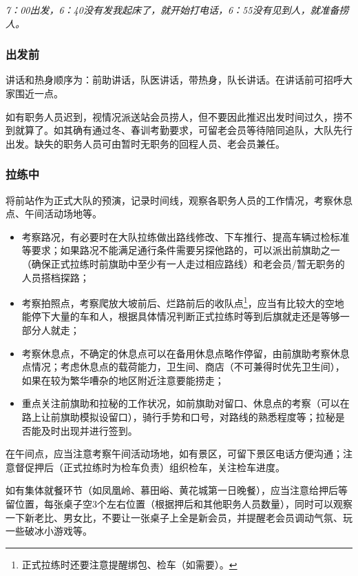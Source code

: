 \documentclass[UTF8]{ctexart}
\begin{document}
\textit{7：00出发，6：40没有发我起床了，就开始打电话，6：55没有见到人，就准备捞人。}

\subsubsection{出发前}

讲话和热身顺序为：前助讲话，队医讲话，带热身，队长讲话。在讲话前可招呼大家围近一点。

如有职务人员迟到，视情况派送站会员捞人，但不要因此推迟出发时间过久，捞不到就算了。如其确有通过冬、春训考勤要求，可留老会员等待陪同追队，大队先行出发。缺失的职务人员可由暂时无职务的回程人员、老会员兼任。

\subsubsection{拉练中}

将前站作为正式大队的预演，记录时间线，观察各职务人员的工作情况，考察休息点、午间活动场地等。

\begin{itemize}[nosep,left=4em]
    \item 考察路况，有必要时在大队拉练做出路线修改、下车推行、提高车辆过检标准等要求；如果路况不能满足通行条件需要另探他路的，可以派出前旗助之一（确保正式拉练时前旗助中至少有一人走过相应路线）和老会员/暂无职务的人员搭档探路；
    \item 考察拍照点，考察爬放大坡前后、烂路前后的收队点\footnote{正式拉练时还要注意提醒绑包、检车（如需要）。}，应当有比较大的空地能停下大量的车和人，根据具体情况判断正式拉练时等到后旗就走还是等够一部分人就走；
    \item 考察休息点，不确定的休息点可以在备用休息点略作停留，由前旗助考察休息点情况；考虑休息点的载荷能力，卫生间、商店（不可兼得时优先卫生间），如果在较为繁华嘈杂的地区附近注意要能捞走；
    \item 重点关注前旗助和拉秘的工作状况，如前旗助对留口、休息点的考察（可以在路上让前旗助模拟设留口），骑行手势和口号，对路线的熟悉程度等；拉秘是否能及时出现并进行签到。
\end{itemize}

在午间点，应当注意考察午间活动场地，如有景区，可留下景区电话方便沟通；注意督促押后（正式拉练时为检车负责）组织检车，关注检车进度。

如有集体就餐环节（如凤凰岭、慕田峪、黄花城第一日晚餐），应当注意给押后等留位置，每张桌子空3个左右位置（根据押后和其他职务人员数量），同时可以观察一下新老比、男女比，不要让一张桌子上全是新会员，并提醒老会员调动气氛、玩一些破冰小游戏等。
\end{document}

